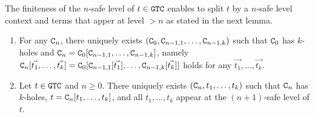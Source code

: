 The finiteness of the $n$-safe level of $t\in{\tt GTC}$ enables 
to split $t$ by a $n$-safe level context and terms that apper at level $>n$
as stated in the next lemma. 

\begin{lemma}\label{lem:split_context}
  \begin{enumerate}
  \item\label{lem:split_context1}
    For any ${\tt C}_{n}$, there uniquely exists
    $({\tt C}_{0},{\tt C}_{n-1,1},\ldots,{\tt C}_{n-1,k})$ such that
    ${\tt C}_{0}$ has $k$-holes and
    ${\tt C}_{n} = {\tt C}_{0}[{\tt C}_{n-1,1},\ldots,{\tt C}_{n-1,k}]$, namely ${\tt C}_{n}[\vec{t_1},\ldots,\vec{t_k}] = {\tt C}_{0}[{\tt C}_{n-1,1}[\vec{t_1}],\ldots,{\tt C}_{n-1,k}[\vec{t_k}]]$ holds for any $\vec{t_1},\ldots,\vec{t_k}$. 
  \item\label{lem:split_context2}
    Let $t\in{\tt GTC}$ and $n\ge 0$.
    There uniquely exists $({\tt C}_{n},t_1,\ldots,t_k)$
    such that ${\tt C}_{n}$ has $k$-holes, $t = {\tt C}_{n}[t_1,\ldots,t_k]$,
    and all $t_1,\ldots,t_k$ appear at the $(n+1)$-safe level of $t$.
  \end{enumerate}
\end{lemma}
